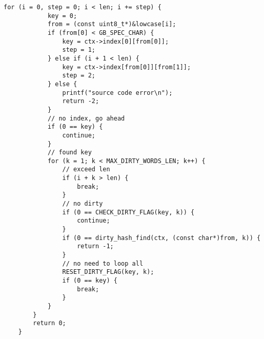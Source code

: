 \begin {itemize}
\begin{lstlisting}[language={[ANSI]C}]
        for (i = 0, step = 0; i < len; i += step) {
            key = 0;
            from = (const uint8_t*)&lowcase[i];
            if (from[0] < GB_SPEC_CHAR) {
                key = ctx->index[0][from[0]];
                step = 1;
            } else if (i + 1 < len) {
                key = ctx->index[from[0]][from[1]];
                step = 2;
            } else {
                printf("source code error\n");
                return -2;
            }
            // no index, go ahead
            if (0 == key) {
                continue;
            }
            // found key
            for (k = 1; k < MAX_DIRTY_WORDS_LEN; k++) {
                // exceed len
                if (i + k > len) {
                    break;
                }
                // no dirty
                if (0 == CHECK_DIRTY_FLAG(key, k)) {
                    continue;
                }
                if (0 == dirty_hash_find(ctx, (const char*)from, k)) {
                    return -1;
                }
                // no need to loop all
                RESET_DIRTY_FLAG(key, k);
                if (0 == key) {
                    break;
                }
            }
        }
        return 0;
    }

    \end{lstlisting}
\end {itemize}


